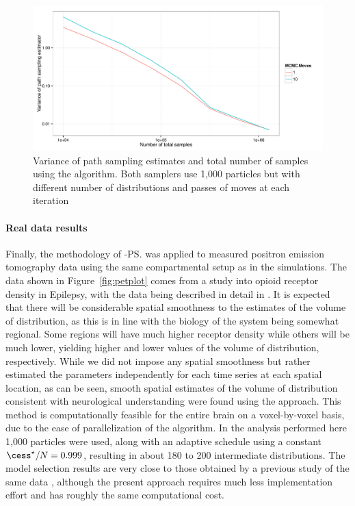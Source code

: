 \begin{figure}[t]
  \includegraphics[width=\linewidth]{fig/MCMC_Iter_Var}
  \caption{Variance of path sampling estimates and total number of samples
    using the \smc[2] algorithm. Both samplers use 1,000 particles but with
    different number of distributions and passes of \mcmc moves at each
    iteration}
  \label{fig:fast mcmc iter}
\end{figure}

\paragraph{Real data results}

Finally, the methodology of \smc[2]-\ps was applied to measured positron
emission tomography data using the same compartmental setup as in the
simulations. The data shown in Figure~\ref{fig:petplot} comes from a study
into opioid receptor density in Epilepsy, with the data being described in
detail in \cite{Jiang:2009kf}. It is expected that there will be considerable
spatial smoothness to the estimates of the volume of distribution, as this is
in line with the biology of the system being somewhat regional. Some regions
will have much higher receptor density while others will be much lower,
yielding higher and lower values of the volume of distribution, respectively.
While we did not impose any spatial smoothness but rather estimated the
parameters independently for each time series at each spatial location, as can
be seen, smooth spatial estimates of the volume of distribution consistent
with neurological understanding were found using the approach. This method is
computationally feasible for the entire brain on a voxel-by-voxel basis, due
to the ease of parallelization of the \smc algorithm. In the analysis
performed here 1,000 particles were used, along with an adaptive schedule
using a constant $\cess^\star/N = 0.999$, resulting in about 180 to 200
intermediate distributions. The model selection results are very close to
those obtained by a  previous study of the same data \cite{Zhou2013}, although
the present approach requires much less implementation effort and has roughly
the same computational cost.

